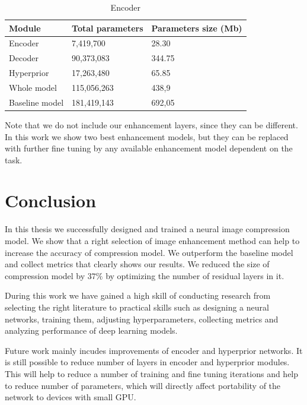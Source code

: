 \begin{table}
    \centering
    \caption{Encoder}
    \label{tab:model}
    \begin{tabular}{p{4cm}|p{4cm}|p{4cm}}
        \hline
        \textbf{Module} & \textbf{Total parameters} & \textbf{Parameters size (Mb)} \\
        \hline
        Encoder         & 7,419,700                 & 28.30                         \\
        \hline
        Decoder         & 90,373,083                & 344.75                        \\
        \hline
        Hyperprior      & 17,263,480                & 65.85                         \\
        \hline
        Whole model     & 115,056,263               & 438,9                         \\
        \hline
        Baseline model  & 181,419,143               & 692,05
    \end{tabular}
\end{table}

Note that we do not include our enhancement layers, since they can be different. In this work we show two best enhancement models, but they can be replaced with further fine tuning by any available enhancement model dependent on the task.


\chapter*{Conclusion}

In this thesis we successfully designed and trained a neural image compression model. We show that a right selection of image enhancement method can help to increase the accuracy of compression model. We outperform the baseline model and collect metrics that clearly shows our results. We reduced the size of compression model by $37\%$ by optimizing the number of residual layers in it.

During this work we have gained a high skill of conducting research from selecting the right literature to practical skills such as designing a neural networks, training them, adjusting hyperparameters, collecting metrics and analyzing performance of deep learning models.

Future work mainly incudes improvements of encoder and hyperprior networks. It is still possible to reduce number of layers in encoder and hyperprior modules. This will help to reduce a number of training and fine tuning iterations and help to reduce number of parameters, which will directly affect portability of the network to devices with small GPU.

